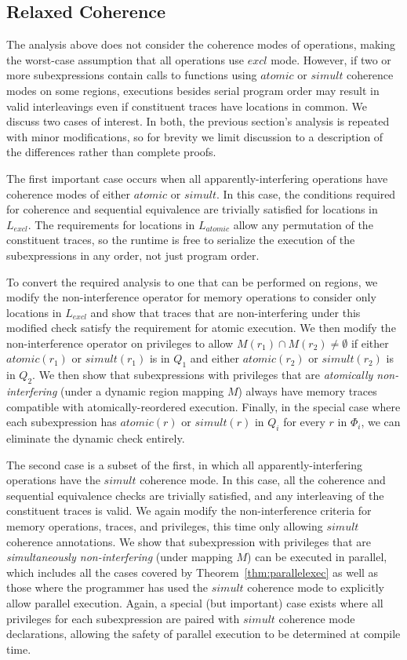 \subsection{Relaxed Coherence}
\label{subsec:relaxed}

The analysis above does not consider the coherence modes of operations,
making the worst-case assumption that all operations use $excl$ mode.  However, if two or more
subexpressions contain calls to functions using $atomic$ or $simult$ coherence modes
on some regions, executions besides serial program order may 
result in valid interleavings even if constituent traces have locations in common.  We discuss
two cases of interest.  In both, the previous section's analysis 
is repeated with minor modifications, so for brevity we limit
discussion to a description of the differences rather than complete proofs.

The first important case occurs when all apparently-interfering operations have coherence modes
of either $atomic$ or $simult$.  In this case, the conditions required for
coherence and sequential equivalence are trivially satisfied for locations in $L_{excl}$.  The
requirements for locations in $L_{atomic}$ allow any permutation of the constituent traces,
so the runtime is free to serialize the execution of the subexpressions in any order, not just
program order.

To convert the required analysis to one that can be performed on regions, we modify
the non-interference operator for memory operations to consider only locations in $L_{excl}$ and show that
traces that are non-interfering under this modified check satisfy the requirement for atomic
execution.  We then modify the non-interference operator on privileges to allow 
$M(r_1) \cap M(r_2) \not= \emptyset$ if either $atomic(r_1)$ or $simult(r_1)$ is in $Q_1$ and
either $atomic(r_2)$ or $simult(r_2)$ is in $Q_2$. We then show that subexpressions with 
privileges that are {\em atomically non-interfering} (under a dynamic region mapping
$M$) always have memory traces compatible with atomically-reordered execution.  Finally,
in the special case where each subexpression has $atomic(r)$ or $simult(r)$ in $Q_i$ for every $r$
in $\Phi_i$, we can eliminate the dynamic check entirely.

The second case is a subset of the first, in which all apparently-interfering operations have
the $simult$ coherence mode.  In this case, all the coherence and sequential equivalence 
checks are trivially satisfied, and any interleaving of the constituent traces is valid.
We again modify the non-interference criteria for memory operations, traces, and privileges, this time
only allowing $simult$ coherence annotations. We show that subexpression with privileges
that are {\em simultaneously non-interfering} (under mapping $M$) can be executed
in parallel, which includes all the cases covered by Theorem~\ref{thm:parallelexec} as well
as those where the programmer has used the $simult$ coherence mode to explicitly allow parallel
execution.  Again, a special (but important) case exists where all privileges for each
subexpression are paired with $simult$ coherence mode declarations, allowing the safety of
parallel execution to be determined at compile time.

